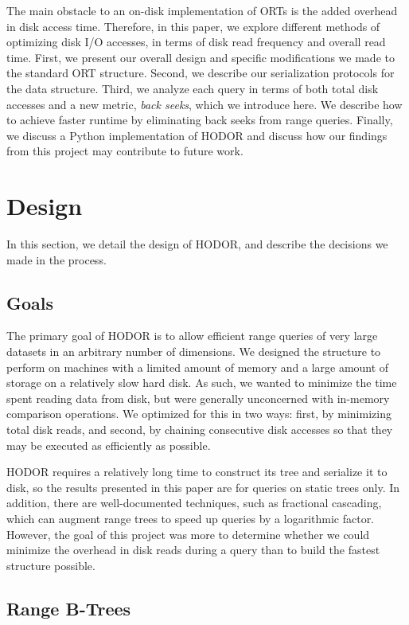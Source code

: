 \documentclass[11pt, oneside]{article}
\begin{document}
The main obstacle to an on-disk implementation of ORTs is the added overhead in
disk access time. Therefore, in this paper, we explore different methods of
optimizing disk I/O accesses, in terms of disk read frequency and overall read
time. First, we present our overall design and specific modifications we made
to the standard ORT structure. Second, we describe our serialization protocols
for the data structure. Third, we analyze each query in terms of both total disk
accesses and a new metric, \textit{back seeks}, which we introduce here. We
describe how to achieve faster runtime by eliminating back seeks from range
queries. Finally, we discuss a Python implementation of HODOR and discuss how our
findings from this project may contribute to future work.

\section{Design}

In this section, we detail the design of HODOR, and describe the decisions we
made in the process.

\subsection{Goals}

The primary goal of HODOR is to allow efficient range queries of very large
datasets in an arbitrary number of dimensions. We designed the structure to
perform on machines with a limited amount of memory and a large amount of
storage on a relatively slow hard disk. As such, we wanted to minimize the
time spent reading data from disk, but were generally unconcerned with
in-memory comparison operations. We optimized for this in two ways: first, by
minimizing total disk reads, and second, by chaining consecutive disk accesses
so that they may be executed as efficiently as possible. 

HODOR requires a relatively long time to construct its tree and serialize it to
disk, so the results presented in this paper are for queries on static trees
only. In addition, there are well-documented techniques, such as fractional
cascading, which can augment range trees to speed up queries by a logarithmic
factor. However, the goal of this project was more to determine whether we could
minimize the overhead in disk reads during a query than to build the fastest
structure possible.

\subsection{Range B-Trees}
\end{document}
